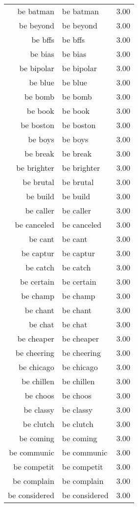 \begin{table}[ht]
\begin{tabular}{rlr}
  be batman & be batman & 3.00 \\ 
  be beyond & be beyond & 3.00 \\ 
  be bffs & be bffs & 3.00 \\ 
  be bias & be bias & 3.00 \\ 
  be bipolar & be bipolar & 3.00 \\ 
  be blue & be blue & 3.00 \\ 
  be bomb & be bomb & 3.00 \\ 
  be book & be book & 3.00 \\ 
  be boston & be boston & 3.00 \\ 
  be boys & be boys & 3.00 \\ 
  be break & be break & 3.00 \\ 
  be brighter & be brighter & 3.00 \\ 
  be brutal & be brutal & 3.00 \\ 
  be build & be build & 3.00 \\ 
  be caller & be caller & 3.00 \\ 
  be canceled & be canceled & 3.00 \\ 
  be cant & be cant & 3.00 \\ 
  be captur & be captur & 3.00 \\ 
  be catch & be catch & 3.00 \\ 
  be certain & be certain & 3.00 \\ 
  be champ & be champ & 3.00 \\ 
  be chant & be chant & 3.00 \\ 
  be chat & be chat & 3.00 \\ 
  be cheaper & be cheaper & 3.00 \\ 
  be cheering & be cheering & 3.00 \\ 
  be chicago & be chicago & 3.00 \\ 
  be chillen & be chillen & 3.00 \\ 
  be choos & be choos & 3.00 \\ 
  be classy & be classy & 3.00 \\ 
  be clutch & be clutch & 3.00 \\ 
  be coming & be coming & 3.00 \\ 
  be communic & be communic & 3.00 \\ 
  be competit & be competit & 3.00 \\ 
  be complain & be complain & 3.00 \\ 
  be considered & be considered & 3.00 \\ 

\end{tabular}
\end{table}
